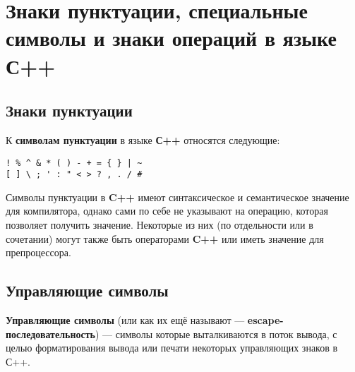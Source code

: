 \section{Знаки пунктуации, специальные символы и знаки операций в языке
С++}\label{ux437ux43dux430ux43aux438-ux43fux443ux43dux43aux442ux443ux430ux446ux438ux438-ux441ux43fux435ux446ux438ux430ux43bux44cux43dux44bux435-ux441ux438ux43cux432ux43eux43bux44b-ux438-ux437ux43dux430ux43aux438-ux43eux43fux435ux440ux430ux446ux438ux439-ux432-ux44fux437ux44bux43aux435-ux441}

\subsection{Знаки
пунктуации}\label{ux437ux43dux430ux43aux438-ux43fux443ux43dux43aux442ux443ux430ux446ux438ux438}

К \textbf{символам пунктуации} в языке \textbf{С++} относятся следующие:

\begin{verbatim}
! % ^ & * ( ) - + = { } | ~
[ ] \ ; ' : " < > ? , . / #
\end{verbatim}

Символы пунктуации в \textbf{C++} имеют синтаксическое и семантическое
значение для компилятора, однако сами по себе не указывают на операцию,
которая позволяет получить значение. Некоторые из них (по отдельности
или в сочетании) могут также быть операторами \textbf{C++} или иметь
значение для препроцессора.

\subsection{Управляющие
символы}\label{ux443ux43fux440ux430ux432ux43bux44fux44eux449ux438ux435-ux441ux438ux43cux432ux43eux43bux44b}

\textbf{Управляющие символы} (или как их ещё называют ---
\textbf{escape-последовательность}) --- символы которые выталкиваются в
поток вывода, с целью форматирования вывода или печати некоторых
управляющих знаков в С++.

